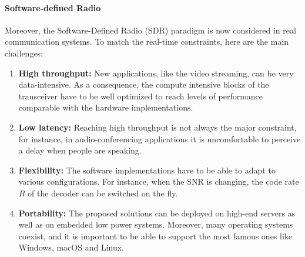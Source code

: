 \paragraph{Software-defined Radio}

Moreover, the Software-Defined Radio (SDR) paradigm is now considered in real
communication systems. To match the real-time constraints, here are the main
challenges:

\begin{enumerate}
  \item \textbf{High throughput:} New applications, like the video streaming,
    can be very data-intensive. As a consequence, the compute intensive blocks
    of the transceiver have to be well optimized to reach levels of performance
    comparable with the hardware implementations.

  \item \textbf{Low latency:} Reaching high throughput is not always the major
    constraint, for instance, in audio-conferencing applications it is
    uncomfortable to perceive a delay when people are speaking.

  \item \textbf{Flexibility:} The software implementations have to be able to
    adapt to various configurations. For instance, when the SNR is changing,
    the code rate $R$ of the decoder can be switched on the fly.

  \item \textbf{Portability:} The proposed solutions can be deployed on high-end
    servers as well as on embedded low power systems. Moreover, many operating
    systems coexist, and it is important to be able to support the most famous
    ones like Windows, macOS and Linux.
\end{enumerate}

